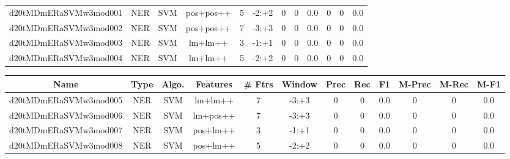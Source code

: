 \documentclass[a4paper]{article}
\begin{document}
\begin{landscape}
\begin{center}
\begin{tabular}{ |c|c|c|c|c|c|c|c|c|c|c|c|}
 
 	
 	\small{ d20tMDmERaSVMw3mod001 } & \small{ NER} & \small{  SVM }  & pos+pos++  &  5 &  \small{  -2:+2 }  &  0 & 0 & 0.0  &  0 & 0 & 0.0 \\
 	

 
 	
 	\small{ d20tMDmERaSVMw3mod002 } & \small{ NER} & \small{  SVM }  & pos+pos++  &  7 &  \small{  -3:+3 }  &  0 & 0 & 0.0  &  0 & 0 & 0.0 \\
 	

 
 	
 	\small{ d20tMDmERaSVMw3mod003 } & \small{ NER} & \small{  SVM }  & lm+lm++  &  3 &  \small{  -1:+1 }  &  0 & 0 & 0.0  &  0 & 0 & 0.0 \\
 	

 
 	
 	\small{ d20tMDmERaSVMw3mod004 } & \small{ NER} & \small{  SVM }  & lm+lm++  &  5 &  \small{  -2:+2 }  &  0 & 0 & 0.0  &  0 & 0 & 0.0 \\
 	
 \hline
\end{tabular}
\end{center}




\begin{center}
\begin{tabular}{ |c|c|c|c|c|c|c|c|c|c|c|c|} 
 \hline
 	Name & Type & Algo. & Features & \# Ftrs & Window & Prec & Rec & F1 & M-Prec & M-Rec & M-F1\\
 \hline

 	

 
 	
 	\small{ d20tMDmERaSVMw3mod005 } & \small{ NER} & \small{  SVM }  & lm+lm++  &  7 &  \small{  -3:+3 }  &  0 & 0 & 0.0  &  0 & 0 & 0.0 \\
 	

 
 	
 	\small{ d20tMDmERaSVMw3mod006 } & \small{ NER} & \small{  SVM }  & lm+pos++  &  7 &  \small{  -3:+3 }  &  0 & 0 & 0.0  &  0 & 0 & 0.0 \\
 	

 
 	
 	\small{ d20tMDmERaSVMw3mod007 } & \small{ NER} & \small{  SVM }  & pos+lm++  &  3 &  \small{  -1:+1 }  &  0 & 0 & 0.0  &  0 & 0 & 0.0 \\
 	

 
 	
 	\small{ d20tMDmERaSVMw3mod008 } & \small{ NER} & \small{  SVM }  & pos+lm++  &  5 &  \small{  -2:+2 }  &  0 & 0 & 0.0  &  0 & 0 & 0.0 \\
 	


\end{tabular}
\end{center}
\end{landscape}
\end{document}
